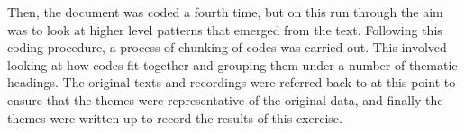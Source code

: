Then, the document was coded a fourth time, but on this run through the aim was to look at higher level patterns that emerged from the text. Following this coding procedure, a process of chunking of codes was carried out. This involved looking at how codes fit together and grouping them under a number of thematic headings. The original texts and recordings were referred back to at this point to ensure that the themes were representative of the original data, and finally the themes were written up to record the results of this exercise.





